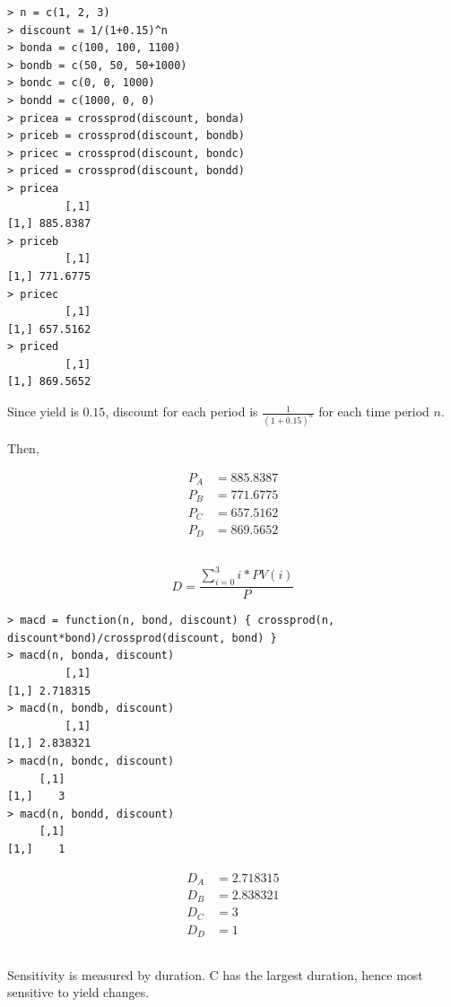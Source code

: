 \documentclass[11pt]{scrartcl}
\begin{document}
\begin{lstlisting}
> n = c(1, 2, 3)
> discount = 1/(1+0.15)^n
> bonda = c(100, 100, 1100)
> bondb = c(50, 50, 50+1000)
> bondc = c(0, 0, 1000)
> bondd = c(1000, 0, 0)
> pricea = crossprod(discount, bonda)
> priceb = crossprod(discount, bondb)
> pricec = crossprod(discount, bondc)
> priced = crossprod(discount, bondd)
> pricea
         [,1]
[1,] 885.8387
> priceb
         [,1]
[1,] 771.6775
> pricec
         [,1]
[1,] 657.5162
> priced
         [,1]
[1,] 869.5652
\end{lstlisting}

Since yield is $0.15$, discount for each period is $\frac{1}{(1+0.15)^n}$ for each time period $n$.

Then,

\begin{align*}
P_A &= 885.8387 \\
P_B &= 771.6775 \\
P_C &= 657.5162 \\
P_D &= 869.5652
\end{align*}

\subsection{}

\[D = \frac{\sum_{i=0}^3 i * PV(i)}{P}\]

\begin{lstlisting}
> macd = function(n, bond, discount) { crossprod(n, discount*bond)/crossprod(discount, bond) }
> macd(n, bonda, discount)
         [,1]
[1,] 2.718315
> macd(n, bondb, discount)
         [,1]
[1,] 2.838321
> macd(n, bondc, discount)
     [,1]
[1,]    3
> macd(n, bondd, discount)
     [,1]
[1,]    1
\end{lstlisting}

\begin{align*}
D_A &= 2.718315 \\
D_B &= 2.838321 \\
D_C &= 3 \\
D_D &= 1
\end{align*}

\subsection{}

Sensitivity is measured by duration. C has the largest duration, hence most sensitive to yield changes.

\subsection{}
\end{document}
